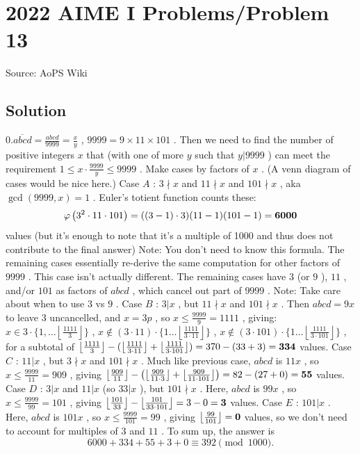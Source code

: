 \documentclass[12pt]{article}
\begin{document}
\section*{{2022 AIME I Problems/Problem 13}}
Source: AoPS Wiki

\subsection*{Solution}
$0.\overline{abcd}=\frac{abcd}{9999} = \frac{x}{y}$ , $9999=9\times 11\times 101$ . Then we need to find the number of positive integers $x$ that (with one of more $y$ such that $y|9999$ ) can meet the requirement $1 \leq {x}\cdot\frac{9999}{y} \leq 9999$ . Make cases by factors of $x$ . (A venn diagram of cases would be nice here.) Case $A$ : $3 \nmid x$ and $11 \nmid x$ and $101 \nmid x$ , aka $\gcd (9999, x)=1$ . Euler's totient function counts these: \[\varphi \left(3^2 \cdot 11 \cdot 101 \right) = ((3-1)\cdot 3)(11-1)(101-1)= \bf{6000}\] values (but it's enough to note that it's a multiple of 1000 and thus does not contribute to the final answer) Note: You don't need to know this formula. The remaining cases essentially re-derive the same computation for other factors of $9999$ . This case isn't actually different. The remaining cases have $3$ (or $9$ ), $11$ , and/or $101$ as factors of $abcd$ , which cancel out part of $9999$ .
Note: Take care about when to use $3$ vs $9$ . Case $B$ : $3|x$ , but $11 \nmid x$ and $101 \nmid x$ . Then $abcd=9x$ to leave 3 uncancelled, and $x=3p$ ,
so $x \leq \frac{9999}{9} = 1111$ , giving: $x \in 3 \cdot \{1, \dots \left\lfloor \frac{1111}{3}\right\rfloor\}$ , $x \notin (3\cdot 11) \cdot \{1 \dots \left\lfloor \frac{1111}{3\cdot 11}\right\rfloor\}$ , $x \notin (3 \cdot 101) \cdot \{1 \dots \left\lfloor \frac{1111}{3 \cdot 101}\right\rfloor\}$ , for a subtotal of $\left\lfloor \frac{1111}{3}\right\rfloor - (\left\lfloor\frac{1111}{3 \cdot 11}\right\rfloor + \left\lfloor\frac{1111}{3 \cdot 101}\right\rfloor ) = 370 - (33+3) = \bf{334}$ values. Case $C$ : $11|x$ , but $3 \nmid x$ and $101 \nmid x$ . Much like previous case, $abcd$ is $11x$ , so $x \leq \frac{9999}{11} = 909$ , giving $\left\lfloor \frac{909}{11}\right\rfloor - \left(\left\lfloor\frac{909}{11 \cdot 3}\right\rfloor + \left\lfloor\frac{909}{11 \cdot 101}\right\rfloor \right) = 82 - (27 + 0) = \bf{55}$ values. Case $D$ : $3|x$ and $11|x$ (so $33|x$ ), but $101 \nmid x$ . Here, $abcd$ is $99x$ , so $x \leq \frac{9999}{99} = 101$ , giving $\left\lfloor \frac{101}{33}\right\rfloor - \left\lfloor \frac{101}{33 \cdot 101}\right\rfloor = 3-0 = \bf{3}$ values. Case $E$ : $101|x$ . Here, $abcd$ is $101x$ , so $x \leq \frac{9999}{101} = 99$ , giving $\left\lfloor \frac{99}{101}\right\rfloor = \bf{0}$ values, so we don't need to account for multiples of $3$ and $11$ . To sum up, the answer is \[6000+334+55+3+0\equiv\boxed{392} \pmod{1000}.\]
\end{document}
